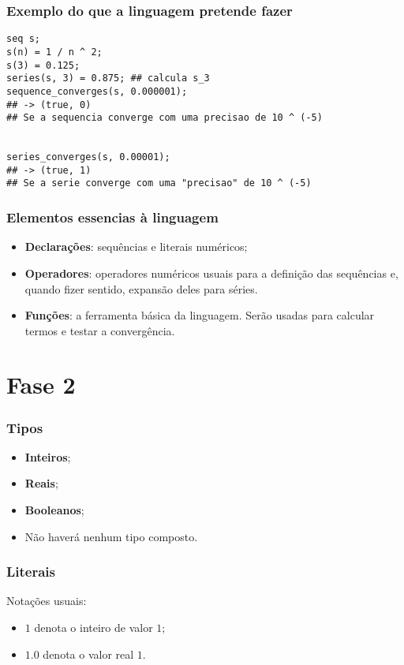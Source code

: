 \documentclass{beamer}
\begin{document}
\begin{frame}[fragile]
  \frametitle{Exemplo do que a linguagem pretende fazer}
  \begin{center}
\begin{verbatim}
seq s;
s(n) = 1 / n ^ 2;
s(3) = 0.125;
series(s, 3) = 0.875; ## calcula s_3
sequence_converges(s, 0.000001);
## -> (true, 0)
## Se a sequencia converge com uma precisao de 10 ^ (-5)


series_converges(s, 0.00001);
## -> (true, 1)
## Se a serie converge com uma "precisao" de 10 ^ (-5)
\end{verbatim}

  \end{center}
\end{frame}

\begin{frame}[fragile]
  \frametitle{Elementos essencias \`a linguagem}
  \begin{itemize}
  \item \textbf{Declara\c c\~oes}: sequ\^encias e literais num\'ericos;
  \item \textbf{Operadores}: operadores num\'ericos usuais para a
    defini\c c\~ao das sequ\^encias e, quando fizer sentido,
    expans\~ao deles para s\'eries.
  \item \textbf{Fun\c c\~oes}: a ferramenta b\'asica da
    linguagem. Ser\~ao usadas para calcular termos e testar a
    converg\^encia.
  \end{itemize}
\end{frame}


\section{Fase 2}

\begin{frame}[fragile]
  \frametitle{Tipos}
  \begin{itemize}
  \item \textbf{Inteiros};
  \item \textbf{Reais};
  \item \textbf{Booleanos};
  \item N\~ao haver\'a nenhum tipo composto.
  \end{itemize}
\end{frame}

\begin{frame}[fragile]
  \frametitle{Literais}
  Nota\c c\~oes usuais:
  \begin{itemize}
  \item $1$ denota o inteiro de valor $1$;
  \item $1.0$ denota o valor real $1$.
  \end{itemize}
\end{frame}
\end{document}
